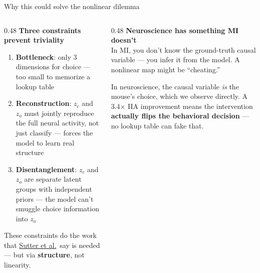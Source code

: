 \documentclass[aspectratio=169,11pt]{beamer}
\begin{document}
\begin{frame}{Why this could solve the nonlinear dilemma}
\begin{columns}[T]
\begin{column}{0.48\textwidth}
\textbf{Three constraints prevent triviality}
\begin{enumerate}\setlength\itemsep{4pt}
  \item \textbf{Bottleneck}: only 3 dimensions for choice --- too small to memorize a lookup table
  \item \textbf{Reconstruction}: $z_c$ and $z_o$ must jointly reproduce the full neural activity, not just classify --- forces the model to learn real structure
  \item \textbf{Disentanglement}: $z_c$ and $z_o$ are separate latent groups with independent priors --- the model can't smuggle choice information into $z_o$
\end{enumerate}

\vspace{0.3em}
{\small These constraints do the work that \href{https://arxiv.org/abs/2501.02043}{Sutter et al.}\ say is needed --- but via \textbf{structure}, not linearity.}
\end{column}
\begin{column}{0.48\textwidth}
\textbf{Neuroscience has something MI doesn't}\\[0.3em]
{\small In MI, you don't know the ground-truth causal variable --- you infer it from the model. A nonlinear map might be ``cheating.''}

\vspace{0.3em}
{\small In neuroscience, the causal variable \emph{is} the mouse's choice, which we observe directly. A 3.4$\times$ IIA improvement means the intervention \textbf{actually flips the behavioral decision} --- no lookup table can fake that.}

\end{column}
\end{columns}
\end{frame}
\end{document}
